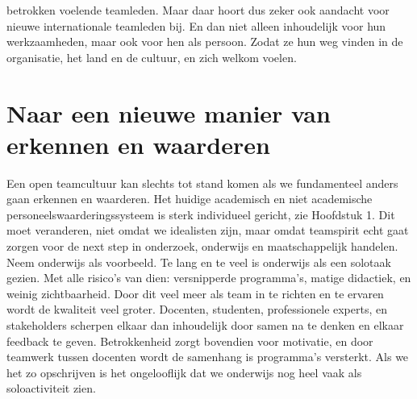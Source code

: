 \documentclass{jote-book}
\begin{document}
betrokken voelende teamleden. Maar daar hoort dus zeker ook aandacht voor nieuwe internationale teamleden bij. En dan niet alleen inhoudelijk voor hun werkzaamheden, maar ook voor hen als persoon. Zodat ze hun weg vinden in de organisatie, het land en de cultuur, en zich welkom voelen.



	\section{Naar een nieuwe manier van erkennen en waarderen}



	Een open teamcultuur kan slechts tot stand komen als we fundamenteel anders gaan erkennen en waarderen. Het huidige academisch en niet academische personeelswaarderingssysteem is sterk individueel gericht, zie Hoofdstuk 1. Dit moet veranderen, niet omdat we idealisten zijn, maar omdat teamspirit echt gaat zorgen voor de next step in onderzoek, onderwijs en maatschappelijk handelen. Neem onderwijs als voorbeeld. Te lang en te veel is onderwijs als een solotaak gezien. Met alle risico's van dien: versnipperde programma's, matige didactiek, en weinig zichtbaarheid. Door dit veel meer als team in te richten en te ervaren wordt de kwaliteit veel groter. Docenten, studenten, professionele experts, en stakeholders scherpen elkaar dan inhoudelijk door samen na te denken en elkaar feedback te geven. Betrokkenheid zorgt bovendien voor motivatie, en door teamwerk tussen docenten wordt de samenhang is programma's versterkt. Als we het zo opschrijven is het ongelooflijk dat we onderwijs nog heel vaak als soloactiviteit zien.
\end{document}
